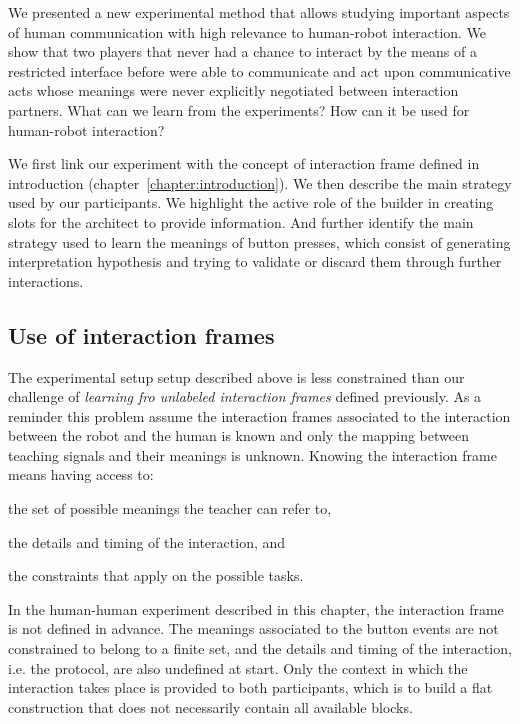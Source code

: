 We presented a new experimental method that allows studying important aspects of human communication with high relevance to human-robot interaction. We show that two players that never had a chance to interact by the means of a restricted interface before were able to communicate and act upon communicative acts whose meanings were never explicitly negotiated between interaction partners. What can we learn from the experiments? How can it be used for human-robot interaction?

We first link our experiment with the concept of interaction frame defined in introduction (chapter~\ref{chapter:introduction}). We then describe the main strategy used by our participants. We highlight the active role of the builder in creating slots for the architect to provide information. And further identify the main strategy used to learn the meanings of button presses, which consist of generating interpretation hypothesis and trying to validate or discard them through further interactions. 


\subsection{Use of interaction frames}
\label{chapter:humanexperiment:frames}

The experimental setup setup described above is less constrained than our challenge of \emph{learning fro unlabeled interaction frames} defined previously. As a reminder this problem assume the interaction frames associated to the interaction between the robot and the human is known and only the mapping between teaching signals and their meanings is unknown. Knowing the interaction frame means having access to: \begin{inparaenum}[(a)] \item the set of possible meanings the teacher can refer to, \item the details and timing of the interaction, and \item the constraints that apply on the possible tasks. \end{inparaenum}

In the human-human experiment described in this chapter, the interaction frame is not defined in advance. The meanings associated to the button events are not constrained to belong to a finite set, and the details and timing of the interaction, i.e. the protocol, are also undefined at start. Only the context in which the interaction takes place is provided to both participants, which is to build a flat construction that does not necessarily contain all available blocks.

